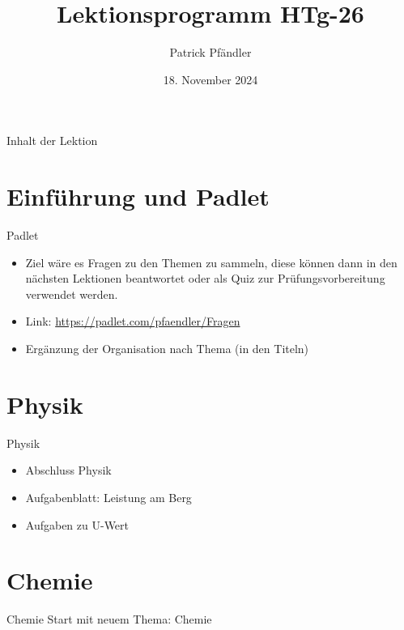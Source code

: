 



\title{\textbf{Lektionsprogramm HTg-26}}
\author{Patrick Pfändler}
\date{18. November 2024}




\frame{\titlepage}

\begin{frame}{Inhalt der Lektion}
    \tableofcontents
\end{frame}


\section{Einführung und Padlet}

\begin{frame}{Padlet}
\begin{itemize}
	\item[\textbullet] Ziel wäre es Fragen zu den Themen zu sammeln, diese können dann in den nächsten Lektionen beantwortet oder als Quiz zur Prüfungsvorbereitung verwendet werden.
	\item[\textbullet] Link: \url{https://padlet.com/pfaendler/Fragen}
	\item[\textbullet] Ergänzung der Organisation nach Thema (in den Titeln)
\end{itemize}
\end{frame}

\section{Physik}
\begin{frame}{Physik}
	\begin{itemize}
		\item[\textbullet] Abschluss Physik
		\item[\textbullet] Aufgabenblatt: Leistung am Berg
		\item[\textbullet] Aufgaben zu U-Wert
	\end{itemize}
\end{frame}

\section{Chemie}
\begin{frame}{Chemie}
    Start mit neuem Thema: Chemie
\end{frame}


